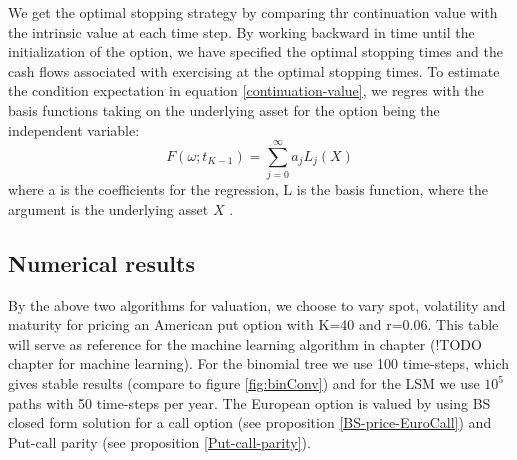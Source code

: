 We get the optimal stopping strategy by comparing thr continuation value with the intrinsic value at each time step. By working backward in time until the initialization of the option, we have specified the optimal stopping times and the cash flows associated with exercising at the optimal stopping times. To estimate the condition expectation in equation \ref{continuation-value}, we regres with the basis functions taking on the underlying asset for the option being the independent variable:
$$F(\omega;t_{K-1})= \sum_{j=0}^\infty a_j L_j(X)$$
where a is the coefficients for the regression, L is the basis function, where the argument is the underlying asset $X$ \parencite{lsm}.


\subsection{Numerical results}
By the above two algorithms for valuation, we choose to vary spot, volatility and maturity for pricing an American put option with K=40 and r=0.06. This table will serve as reference for the machine learning algorithm in chapter (!TODO chapter for machine learning). For the binomial tree we use 100 time-steps, which gives stable results (compare to figure \ref{fig:binConv}) and for the LSM we use $10^5$ paths with 50 time-steps per year. The European option is valued by using BS closed form solution for a call option (see proposition \ref{BS-price-EuroCall}) and Put-call parity (see proposition \ref{Put-call-parity}).
